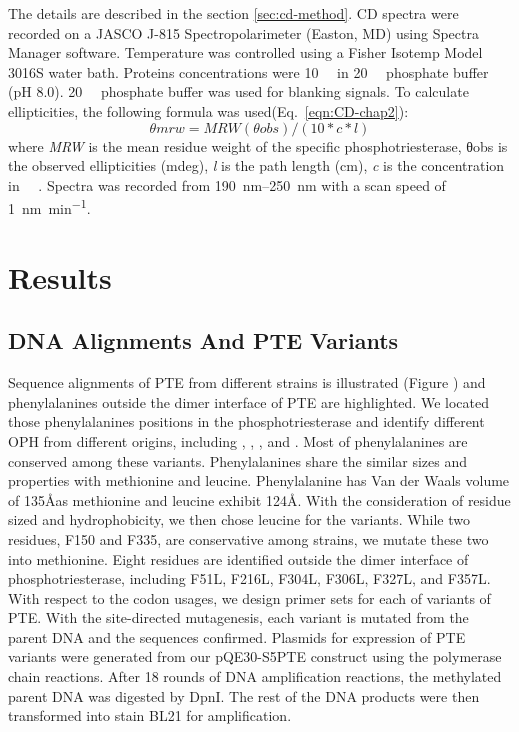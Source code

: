 \begin{refsection}
The details are described in the section \ref{sec:cd-method}. CD spectra were
recorded on a JASCO J-815 Spectropolarimeter (Easton, MD) using Spectra Manager
software. Temperature was controlled using a Fisher Isotemp Model 3016S water
bath. Proteins concentrations were \SI{10}{\micro\Molar} in
\SI{20}{\milli\Molar} phosphate buffer (pH 8.0). \SI{20}{\milli\Molar}
phosphate buffer was used for blanking signals. To calculate ellipticities, the
following formula was used(Eq.~\ref{eqn:CD-chap2}): 
\begin{equation}
    θmrw = MRW(θobs) / (10 * c * l)
    \label{eqn:CD-chap2}
\end{equation}
where \emph{MRW} is the mean residue weight of the specific phosphotriesterase,
θobs is the observed ellipticities (mdeg), \emph{l} is the path length (cm),
\emph{c} is the concentration in \SI{}{\micro\Molar}. Spectra was recorded from
\SIrange{190}{250}{\nm} with a scan speed of \SI{1}{\nano\meter\per\minute}.

\section{Results}

\subsection{DNA Alignments And PTE Variants}

Sequence alignments of PTE from different strains is illustrated (Figure ) and
phenylalanines outside the dimer interface of PTE are highlighted. We located
those phenylalanines positions in the phosphotriesterase and identify different
OPH from different origins, including  ,
, , and . Most
of phenylalanines are conserved among these variants. Phenylalanines share the
similar sizes and properties with methionine and leucine\cite{Richards1974}.
Phenylalanine has Van der Waals volume of 135\AA as methionine and leucine
exhibit 124\AA. With the consideration of residue sized and hydrophobicity,
we then chose leucine for the variants\cite{Barnes2007}. While two residues,
F150 and F335, are conservative among strains, we mutate these two into
methionine.  Eight residues are identified outside the dimer interface of
phosphotriesterase,  including F51L, F216L, F304L, F306L, F327L, and F357L.
With respect to the codon usages\cite{Sivashanmugam2009b}, we design primer
sets for each of variants of PTE.  With the site-directed mutagenesis, each
variant is mutated from the parent DNA and the sequences confirmed.  Plasmids
for expression of PTE variants were generated from our pQE30-S5PTE construct
using the polymerase chain reactions.  After 18 rounds of DNA amplification
reactions, the methylated parent DNA was digested by DpnI.  The rest of the DNA
products were then transformed into  stain BL21 for
amplification.   


\end{refsection}

